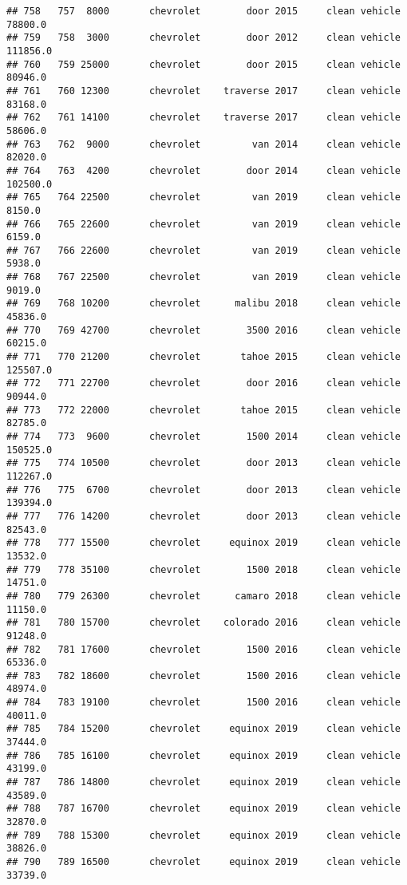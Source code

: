 \documentclass[
]{article}
\begin{document}
\begin{verbatim}
## 758   757  8000       chevrolet        door 2015     clean vehicle   78800.0
## 759   758  3000       chevrolet        door 2012     clean vehicle  111856.0
## 760   759 25000       chevrolet        door 2015     clean vehicle   80946.0
## 761   760 12300       chevrolet    traverse 2017     clean vehicle   83168.0
## 762   761 14100       chevrolet    traverse 2017     clean vehicle   58606.0
## 763   762  9000       chevrolet         van 2014     clean vehicle   82020.0
## 764   763  4200       chevrolet        door 2014     clean vehicle  102500.0
## 765   764 22500       chevrolet         van 2019     clean vehicle    8150.0
## 766   765 22600       chevrolet         van 2019     clean vehicle    6159.0
## 767   766 22600       chevrolet         van 2019     clean vehicle    5938.0
## 768   767 22500       chevrolet         van 2019     clean vehicle    9019.0
## 769   768 10200       chevrolet      malibu 2018     clean vehicle   45836.0
## 770   769 42700       chevrolet        3500 2016     clean vehicle   60215.0
## 771   770 21200       chevrolet       tahoe 2015     clean vehicle  125507.0
## 772   771 22700       chevrolet        door 2016     clean vehicle   90944.0
## 773   772 22000       chevrolet       tahoe 2015     clean vehicle   82785.0
## 774   773  9600       chevrolet        1500 2014     clean vehicle  150525.0
## 775   774 10500       chevrolet        door 2013     clean vehicle  112267.0
## 776   775  6700       chevrolet        door 2013     clean vehicle  139394.0
## 777   776 14200       chevrolet        door 2013     clean vehicle   82543.0
## 778   777 15500       chevrolet     equinox 2019     clean vehicle   13532.0
## 779   778 35100       chevrolet        1500 2018     clean vehicle   14751.0
## 780   779 26300       chevrolet      camaro 2018     clean vehicle   11150.0
## 781   780 15700       chevrolet    colorado 2016     clean vehicle   91248.0
## 782   781 17600       chevrolet        1500 2016     clean vehicle   65336.0
## 783   782 18600       chevrolet        1500 2016     clean vehicle   48974.0
## 784   783 19100       chevrolet        1500 2016     clean vehicle   40011.0
## 785   784 15200       chevrolet     equinox 2019     clean vehicle   37444.0
## 786   785 16100       chevrolet     equinox 2019     clean vehicle   43199.0
## 787   786 14800       chevrolet     equinox 2019     clean vehicle   43589.0
## 788   787 16700       chevrolet     equinox 2019     clean vehicle   32870.0
## 789   788 15300       chevrolet     equinox 2019     clean vehicle   38826.0
## 790   789 16500       chevrolet     equinox 2019     clean vehicle   33739.0

\end{verbatim}
\end{document}
